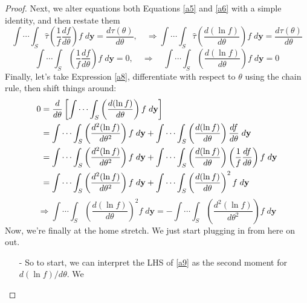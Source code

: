 \documentclass[a4paper,12pt]{scrartcl}
\begin{document}
\begin{proof}
   Next, we alter equations both Equations \ref{a5} and \ref{a6} with a
   simple identity, and then restate them
   \begin{equation}
      \label{a7}
      \int \cdots \int_S  \hat{\tau} \left(\frac{1}{f}
	 \frac{df}{d\theta}\right) f
	 \; d\mathbf{y} = \frac{d\tau(\theta)}{d\theta},\quad\Rightarrow
      \int \cdots \int_S  \hat{\tau} \left(
	 \frac{d(\ln f)}{d\theta}\right) f
	 \; d\mathbf{y} = \frac{d\tau(\theta)}{d\theta}
   \end{equation}
   \begin{equation}
      \label{a8}
      \int \cdots \int_S \left(\frac{1}{f}
	 \frac{df}{d\theta}\right) f \; d\mathbf{y} = 0,\quad\Rightarrow
	 \quad	  \int \cdots \int_S  \left(
	 \frac{d(\ln f)}{d\theta}\right) f
	 \; d\mathbf{y} = 0
   \end{equation}
   Finally, let's take Expression \ref{a8},
   differentiate with respect to $\theta$ using the chain rule,
   then shift things around:
   \begin{align*}
      0 &= \frac{d}{d\theta}\left[\int \cdots \int_S  \left(
	 \frac{d(\ln f)}{d\theta}\right) f
	 \; d\mathbf{y}\right] \notag \\
      &= \int \cdots \int_S  \left(
	 \frac{d^2(\ln f)}{d\theta^2}\right) f
	 \; d\mathbf{y} + \int \cdots \int_S  \left(
	 \frac{d(\ln f)}{d\theta}\right) \frac{df}{d\theta}
	 \; d\mathbf{y} \notag\\
      &= \int \cdots \int_S  \left(
	 \frac{d^2(\ln f)}{d\theta^2}\right) f
	 \; d\mathbf{y} + \int \cdots \int_S  \left(
	 \frac{d(\ln f)}{d\theta}\right)
	 \left(\frac{1}{f} \frac{df}{d\theta}\right) f
	 \; d\mathbf{y}\notag \\
      &= \int \cdots \int_S  \left(
	 \frac{d^2(\ln f)}{d\theta^2}\right) f
	 \; d\mathbf{y} + \int \cdots \int_S  \left(
	 \frac{d(\ln f)}{d\theta}\right)^2 f
	 \; d\mathbf{y} \notag\\
   \end{align*}
   \begin{equation}
      \label{a9}
      \Rightarrow \int \cdots \int_S  \left(
	 \frac{d(\ln f)}{d\theta}\right)^2 f \; d\mathbf{y}  =
	 - \int \cdots \int_S  \left(
	 \frac{d^2(\ln f)}{d\theta^2}\right) f \; d\mathbf{y}
   \end{equation}
   Now, we're finally at the home stretch. We just start plugging
   in from here on out.
   \begin{itemize}
      \item[-]{So to start, we can interpret the LHS of
	 \ref{a9} as the second moment for $d(\ln f)/ d\theta$. We
}
\end{itemize}
\end{proof}
\end{document}

